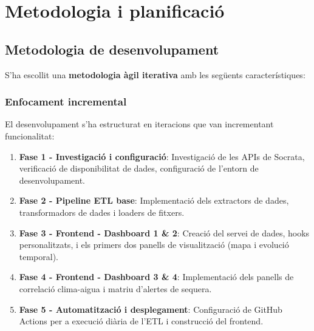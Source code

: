 

\chapter{Metodologia i planificació}
\label{Ch:Methodology}


\section{Metodologia de desenvolupament}

S'ha escollit una \textbf{metodologia àgil iterativa} amb les següents característiques:

\subsection{Enfocament incremental}

El desenvolupament s'ha estructurat en iteracions que van incrementant funcionalitat:

\begin{enumerate}
    \item \textbf{Fase 1 - Investigació i configuració}: Investigació de les APIs de Socrata, verificació de disponibilitat de dades, configuració de l'entorn de desenvolupament.
    
    \item \textbf{Fase 2 - Pipeline ETL base}: Implementació dels extractors de dades, transformadors de dades i loaders de fitxers.
    
    \item \textbf{Fase 3 - Frontend - Dashboard 1 \& 2}: Creació del servei de dades, hooks personalitzats, i els primers dos panells de visualització (mapa i evolució temporal).
    
    \item \textbf{Fase 4 - Frontend - Dashboard 3 \& 4}: Implementació dels panells de correlació clima-aigua i matriu d'alertes de sequera.
    
    \item \textbf{Fase 5 - Automatització i desplegament}: Configuració de GitHub Actions per a execució diària de l'ETL i construcció del frontend.
\end{enumerate}


